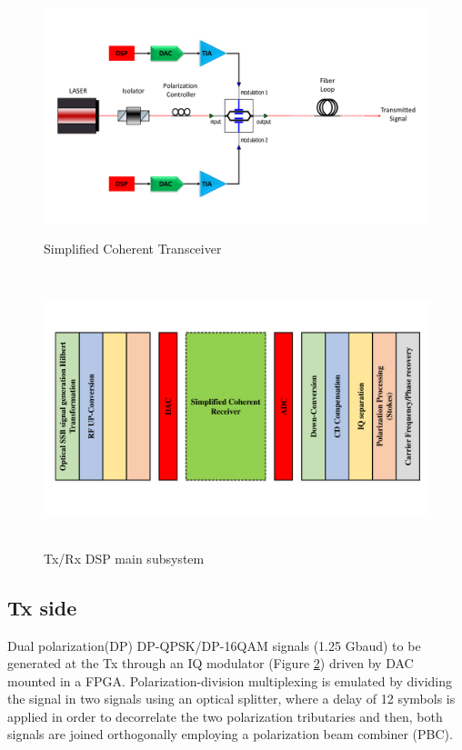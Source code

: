 \begin{figure}[h]
	\centering
	\includegraphics[width=1.0\textwidth, height=7cm]{./sdf/simplified_coherent_receiver/figures/Single_Polarization_Tx.pdf}
	\caption{Simplified Coherent Transceiver}\label{simplified_coherent_transceiver}
\end{figure}

\begin{figure}[h]
	\centering
	\includegraphics[width=1.0\textwidth, height=8cm]{./sdf/simplified_coherent_receiver/figures/detailed_subsystem.pdf}
	\caption{Tx/Rx DSP main subsystem}\label{DSP_main_subsystem}
\end{figure}

\subsection{Tx side}
Dual polarization(DP) DP-QPSK/DP-16QAM signals (1.25 Gbaud) to be generated at the Tx through an IQ modulator (Figure \ref{DSP_main_subsystem}) driven by DAC mounted in a FPGA. Polarization-division multiplexing is emulated by dividing the signal in two signals using an optical splitter, where a delay of 12 symbols is applied in order to decorrelate the two polarization tributaries and then, both signals are joined orthogonally employing a polarization beam combiner (PBC).

